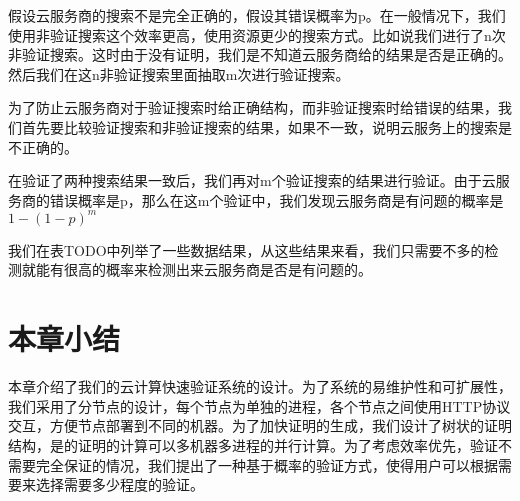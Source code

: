 假设云服务商的搜索不是完全正确的，假设其错误概率为p。在一般情况下，我们使用非验证搜索这个效率更高，使用资源更少的搜索方式。比如说我们进行了n次非验证搜索。这时由于没有证明，我们是不知道云服务商给的结果是否是正确的。然后我们在这n非验证搜索里面抽取m次进行验证搜索。

为了防止云服务商对于验证搜索时给正确结构，而非验证搜索时给错误的结果，我们首先要比较验证搜索和非验证搜索的结果，如果不一致，说明云服务上的搜索是不正确的。

在验证了两种搜索结果一致后，我们再对m个验证搜索的结果进行验证。由于云服务商的错误概率是p，那么在这m个验证中，我们发现云服务商是有问题的概率是$1-(1-p)^m$

我们在表TODO中列举了一些数据结果，从这些结果来看，我们只需要不多的检测就能有很高的概率来检测出来云服务商是否是有问题的。
\section{本章小结}
本章介绍了我们的云计算快速验证系统的设计。为了系统的易维护性和可扩展性，我们采用了分节点的设计，每个节点为单独的进程，各个节点之间使用HTTP协议交互，方便节点部署到不同的机器。为了加快证明的生成，我们设计了树状的证明结构，是的证明的计算可以多机器多进程的并行计算。为了考虑效率优先，验证不需要完全保证的情况，我们提出了一种基于概率的验证方式，使得用户可以根据需要来选择需要多少程度的验证。
